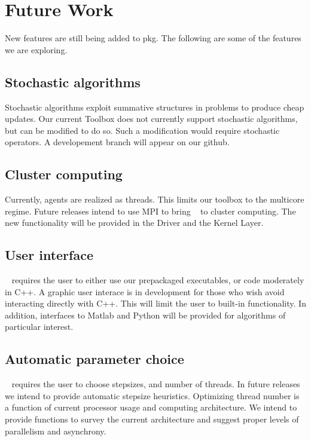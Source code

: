 \section{Future Work}

New features are still being added to pkg. The following are some of the features we are exploring.

\subsection{Stochastic algorithms} 

Stochastic algorithms exploit summative structures in problems to produce cheap updates. Our current Toolbox does not currently support stochastic algorithms, but can be modified to do so. Such a modification would require stochastic operators. A developement branch will appear on our github.  

\subsection{Cluster computing}
 
 Currently, agents are realized as threads.
 This limits our toolbox to the multicore regime.
 Future releases intend to use MPI to bring \pkg~ to cluster computing. The new functionality will be provided in the Driver and the Kernel Layer. 

\subsection{User interface}
 \pkg~ requires the user to either use our prepackaged executables, or code moderately in C++.
 A graphic user interace is in development for those who wish avoid interacting directly with C++.
 This will limit the user to built-in functionality.
 In addition, interfaces to Matlab and Python will be provided for algorithms of particular interest.
 
\subsection{Automatic parameter choice}
\pkg~ requires the user to choose stepsizes, and number of threads.
In future releases we intend to provide automatic stepsize heuristics. 
Optimizing thread number is a function of current processor usage and computing architecture. 
We intend to provide functions to survey the current architecture and suggest proper levels of parallelism and asynchrony.

